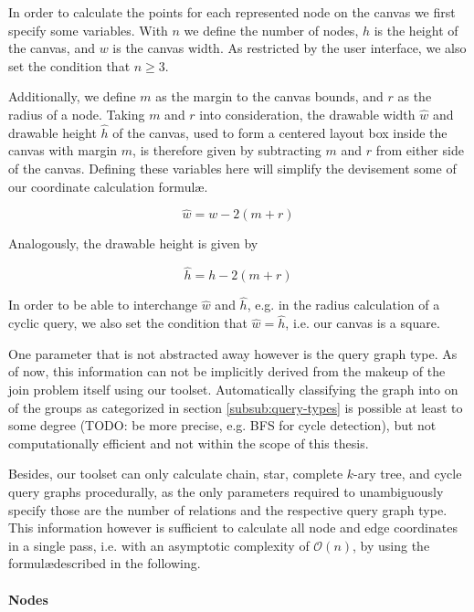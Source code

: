In order to calculate the points for each represented node on the canvas we first specify some variables.
With $n$ we define the number of nodes, $h$ is the height of the canvas, and $w$ is the canvas width. 
As restricted by the user interface, we also set the condition that $n \geq 3$.

Additionally, we define $m$ as the margin to the canvas bounds, and $r$ as the radius of a node.
Taking $m$ and $r$ into consideration, the drawable width $\hat{w}$ and drawable height $\hat{h}$ of the canvas, used to form a centered layout box inside the canvas with margin $m$, is therefore given by subtracting $m$ and $r$ from either side of the canvas. Defining these variables here will simplify the devisement some of our coordinate calculation formul\ae.

\begin{equation}\label{eqn:painting-w_hat}
    \hat{w} = w - 2(m + r)
\end{equation}

Analogously, the drawable height is given by

\begin{equation}\label{eqn:painting-h_hat}
    \hat{h} = h - 2(m + r)    
\end{equation}

In order to be able to interchange $\hat{w}$ and $\hat{h}$, e.g. in the radius calculation of a cyclic query, we also set the condition that $\hat{w} = \hat{h}$, i.e. our canvas is a square.

One parameter that is not abstracted away however is the query graph type. As of now, this information can not be implicitly derived from the makeup of the join problem itself using our toolset. Automatically classifying the graph into on of the groups as categorized in section \ref{subsub:query-types} is possible at least to some degree (TODO: be more precise, e.g. BFS for cycle detection), but not computationally efficient and not within the scope of this thesis.

Besides, our toolset can only calculate chain, star, complete $k$-ary tree, and cycle query graphs procedurally, as the only parameters required to unambiguously specify those are the number of relations and the respective query graph type. This information however is sufficient to calculate all node and edge coordinates in a single pass, i.e. with an asymptotic complexity of $\mathcal{O}(n)$, by using the formul\ae described in the following.

\paragraph{Nodes}

